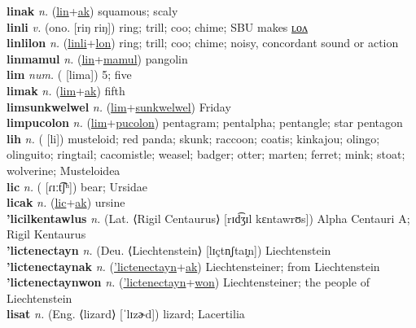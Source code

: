 \textbf{linak} \textit{n.} (\hyperref[lin]{lin}+\hyperref[ak]{ak})
squamous; scaly \label{linak} \\
\textbf{linli} \textit{v.} (ono. [riŋ riŋ])
ring; trill; coo; chime; SBU makes \hyperref[linlilon]{ʟᴏᴧ} \label{linli} \\
\textbf{linlilon} \textit{n.} (\hyperref[linli]{linli}+\hyperref[lon]{lon})
ring; trill; coo; chime; noisy, concordant sound or action \label{linlilon} \\
\textbf{linmamul} \textit{n.} (\hyperref[lin]{lin}+\hyperref[mamul]{mamul})
pangolin \label{linmamul} \\
\textbf{lim} \textit{num.} ( [lima])
5; five \label{lim} \\
\textbf{limak} \textit{n.} (\hyperref[lim]{lim}+\hyperref[ak]{ak})
fifth \label{limak} \\
\textbf{limsunkwelwel} \textit{n.} (\hyperref[lim]{lim}+\hyperref[sunkwelwel]{sunkwelwel})
Friday \label{limsunkwelwel} \\
\textbf{limpucolon} \textit{n.} (\hyperref[lim]{lim}+\hyperref[pucolon]{pucolon})
pentagram; pentalpha; pentangle; star pentagon \label{limpucolon} \\
\textbf{lih} \textit{n.} ( [li])
musteloid; red panda; skunk; raccoon; coatis; kinkajou; olingo; olinguito; ringtail; cacomistle; weasel; badger; otter; marten; ferret; mink; stoat; wolverine; Musteloidea \label{lih} \\
\textbf{lic} \textit{n.} ( [ɾɪːt͡ʃʰ])
bear; Ursidae \label{lic} \\
\textbf{licak} \textit{n.} (\hyperref[lic]{lic}+\hyperref[ak]{ak})
ursine \label{licak} \\
\textbf{'licilkentawlus} \textit{n.} (Lat. ⟨Rigil Centaurus⟩ [rɪd͡ʒɪl kɛntawrʊs])
Alpha Centauri A; Rigil Kentaurus \label{'licilkentawlus} \\
\textbf{'lictenectayn} \textit{n.} (Deu. ⟨Liechtenstein⟩ [lɪçtn̩ʃtaɪ̯n])
Liechtenstein \label{'lictenectayn} \\
\textbf{'lictenectaynak} \textit{n.} (\hyperref['lictenectayn]{'lictenectayn}+\hyperref[ak]{ak})
Liechtensteiner; from Liechtenstein \label{'lictenectaynak} \\
\textbf{'lictenectaynwon} \textit{n.} (\hyperref['lictenectayn]{'lictenectayn}+\hyperref[won]{won})
Liechtensteiner; the people of Liechtenstein \label{'lictenectaynwon} \\
\textbf{lisat} \textit{n.} (Eng. ⟨lizard⟩ [ˈlɪzɚd])
lizard; Lacertilia \label{lisat} \\

